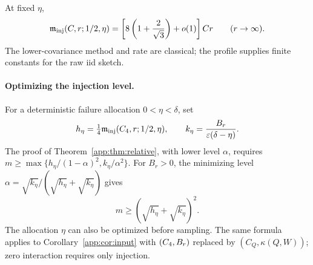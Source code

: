 \documentclass[11pt,a4paper]{article}
\theoremstyle{definition}\newtheorem{definition}[theorem]{Definition}
\theoremstyle{remark}\newtheorem{remark}[theorem]{Remark}
\numberwithin{equation}{section}
\begin{document}
At fixed $\eta$,
\[
 \mathfrak m_{\rm inj}(C,r;1/2,\eta)
 =\left[8\left(1+\frac2{\sqrt3}\right)+o(1)\right]Cr
 \qquad(r\to\infty).
\]
The lower-covariance method and rate are classical; the profile supplies
finite constants for the raw iid sketch.

\paragraph{Optimizing the injection level.}
For a deterministic failure allocation $0<\eta<\delta$, set
\[
 h_\eta=\tfrac14\mathfrak m_{\rm inj}({C_4},r;1/2,\eta),\qquad
 k_\eta=\frac{B_r}{\varepsilon(\delta-\eta)}.
\]
The proof of Theorem~\ref{app:thm:relative}, with lower level $\alpha$,
requires $m\ge\max\{h_\eta/(1-\alpha)^2,k_\eta/\alpha^2\}$.
For $B_r>0$, the minimizing level
$\alpha=\sqrt{k_\eta}/(\sqrt{h_\eta}+\sqrt{k_\eta})$ gives
\begin{equation}\label{app:eq:relative-balanced}
 m\ge(\sqrt{h_\eta}+\sqrt{k_\eta})^2.
\end{equation}
The allocation $\eta$ can also be optimized before sampling. The same
formula applies to Corollary~\ref{app:cor:input} with
$({C_4},B_r)$ replaced by $(C_Q,\kappa(Q,W))$; zero interaction
requires only injection.
\end{document}
